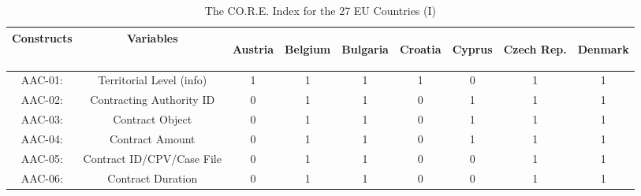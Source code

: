 \documentclass[a4paper, twoside]{report}
\begin{document}
\begin{table}[htbp]
  \centering
  \caption{The CO.R.E. Index for the 27 EU Countries (I)}
   \tabcolsep=0.80cm
	\renewcommand{\arraystretch}{0.95}
	\begin{adjustbox}{max width=\linewidth}
    \begin{tabular}{rcccccccc}
    \multicolumn{1}{c}{Constructs} & Variables & \multicolumn{1}{l}{\begin{sideways}Austria\end{sideways}} & \multicolumn{1}{l}{\begin{sideways}Belgium\end{sideways}} & \multicolumn{1}{l}{\begin{sideways}Bulgaria\end{sideways}} & \multicolumn{1}{l}{\begin{sideways}Croatia\end{sideways}} & \multicolumn{1}{l}{\begin{sideways}Cyprus\end{sideways}} & \multicolumn{1}{l}{\begin{sideways}Czech Rep.\end{sideways}} & \multicolumn{1}{l}{\begin{sideways}Denmark\end{sideways}} \\
    \midrule
    \multicolumn{1}{c}{AAC-01:} & \multicolumn{1}{p{19em}}{Territorial Level (info)} & 1     & 1     & 1     & 1     & 0     & 1     & 1 \\
    \multicolumn{1}{c}{AAC-02:} & \multicolumn{1}{p{19em}}{Contracting Authority ID} & 0     & 1     & 1     & 0     & 1     & 1     & 1 \\
    \multicolumn{1}{c}{AAC-03:} & \multicolumn{1}{p{19em}}{Contract Object} & 0     & 1     & 1     & 0     & 1     & 1     & 1 \\
    \multicolumn{1}{c}{AAC-04:} & \multicolumn{1}{p{19em}}{Contract Amount} & 0     & 1     & 1     & 0     & 1     & 1     & 1 \\
    \multicolumn{1}{c}{AAC-05:} & \multicolumn{1}{p{19em}}{Contract ID/CPV/Case File} & 0     & 1     & 1     & 0     & 0     & 1     & 1 \\
    \multicolumn{1}{c}{AAC-06:} & \multicolumn{1}{p{19em}}{Contract Duration} & 0     & 1     & 1     & 0     & 0     & 1     & 1 \\

\end{tabular}
\end{adjustbox}
\end{table}
\end{document}
